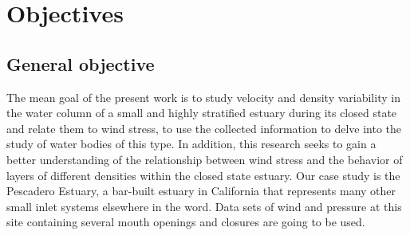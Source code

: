 \documentclass[11pt,letterpaper]{article}
\begin{document}



\section{Objectives}


\subsection{General objective}


The mean goal of the present work is to study velocity and density variability in the water column of a small and highly stratified estuary during its closed state and relate them to wind stress, to use the collected information to delve into the study of water bodies of this type. In addition, this research seeks to gain a better understanding of the relationship between wind stress and the behavior of layers of different densities within the closed state estuary.  Our case study is the Pescadero Estuary, a bar-built estuary in California that represents many other small inlet systems elsewhere in the word. Data sets of wind and pressure at this site containing several mouth openings and closures are going to be used.\\
\end{document}
